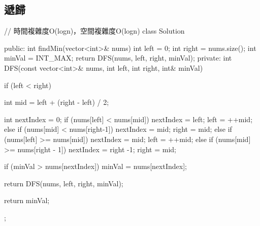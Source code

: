 \subsection{遞歸}
\begin{Code}
// 時間複雜度O(logn)，空間複雜度O(logn)
class Solution {
public:
    int findMin(vector<int>& nums) {
        int left = 0;
        int right = nums.size();
        int minVal = INT_MAX;
        return DFS(nums, left, right, minVal);
    }
private:
    int DFS(const vector<int>& nums, int left, int right, int& minVal) {
        if (left < right) {
            int mid = left + (right - left) / 2;

            int nextIndex = 0;
            if (nums[left] < nums[mid]) {
                nextIndex = left;
                left = ++mid;
            }
            else if (nums[mid] < nums[right-1]) {
                nextIndex = mid;
                right = mid;
            }
            else if (nums[left] >= nums[mid]) {
                nextIndex = mid;
                left = ++mid;
            }
            else if (nums[mid] >= nums[right - 1]) {
                nextIndex = right -1;
                right = mid;
            }

            if (minVal > nums[nextIndex])
                minVal = nums[nextIndex];

            return DFS(nums, left, right, minVal);
        }
        return minVal;
    }
};
\end{Code}
